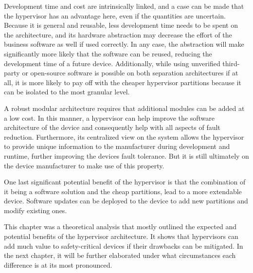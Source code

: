Development time and cost are intrinsically linked, and a case can be made that the hypervisor has an advantage here, even if the quantities are uncertain. Because it is general and reusable, less development time needs to be spent on the architecture, and its hardware abstraction may decrease the effort of the business software as well if used correctly. In any case, the abstraction will make significantly more likely that the software can be reused, reducing the development time of a future device.
Additionally, while using unverified third-party or open-source software is possible on both separation architectures if at all, it is more likely to pay off with the cheaper hypervisor partitions because it can be isolated to the most granular level.

A robust modular architecture requires that additional modules can be added at a low cost. In this manner, a hypervisor can help improve the software architecture of the device and consequently help with all aspects of fault reduction. Furthermore, its centralized view on the system allows the hypervisor to provide unique information to the manufacturer during development and runtime, further improving the devices fault tolerance.
But it is still ultimately on the device manufacturer to make use of this property.

One last significant potential benefit of the hypervisor is that the combination of it being a software solution and the cheap partitions, lead to a more extendable device. Software updates can be deployed to the device to add new partitions and modify existing ones. 

This chapter was a theoretical analysis that mostly outlined the expected and potential benefits of the hypervisor architecture. It shows that hypervisors can add much value to safety-critical devices if their drawbacks can be mitigated.  In the next chapter, it will be further elaborated under what circumstances each difference is at its most pronounced.